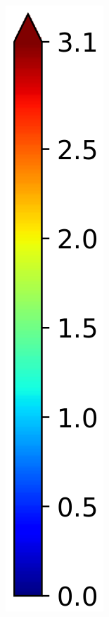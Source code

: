 \documentclass{article}
\begin{document}
\begin{figure}
\begin{subfigure}{0.0544\linewidth}
        \includegraphics[width=\linewidth]{colorbar_jet.png}
  \end{subfigure}
  \end{figure}
\end{document}
